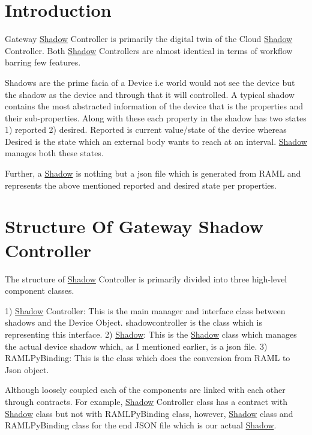 \hypertarget{index_intro_sec}{}\section{Introduction}\label{index_intro_sec}
Gateway \hyperlink{classShadow}{Shadow} Controller is primarily the digital twin of the Cloud \hyperlink{classShadow}{Shadow} Controller. Both \hyperlink{classShadow}{Shadow} Controllers are almost identical in terms of workflow barring few features.

Shadows are the prime facia of a Device i.\+e world would not see the device but the shadow as the device and through that it will controlled. A typical shadow contains the most abstracted information of the device that is the properties and their sub-\/properties. Along with these each property in the shadow has two states 1) reported 2) desired. Reported is current value/state of the device whereas Desired is the state which an external body wants to reach at an interval. \hyperlink{classShadow}{Shadow} manages both these states.

Further, a \hyperlink{classShadow}{Shadow} is nothing but a json file which is generated from R\+A\+ML and represents the above mentioned reported and desired state per properties.\hypertarget{index_structure_sec}{}\section{Structure Of Gateway Shadow Controller}\label{index_structure_sec}
The structure of \hyperlink{classShadow}{Shadow} Controller is primarily divided into three high-\/level component classes.

1) \hyperlink{classShadow}{Shadow} Controller\+: This is the main manager and interface class between shadows and the Device Object. shadowcontroller is the class which is representing this interface. 2) \hyperlink{classShadow}{Shadow}\+: This is the \hyperlink{classShadow}{Shadow} class which manages the actual device shadow which, as I mentioned earlier, is a json file. 3) R\+A\+M\+L\+Py\+Binding\+: This is the class which does the conversion from R\+A\+ML to Json object.

Although loosely coupled each of the components are linked with each other through contracts. For example, \hyperlink{classShadow}{Shadow} Controller class has a contract with \hyperlink{classShadow}{Shadow} class but not with R\+A\+M\+L\+Py\+Binding class, however, \hyperlink{classShadow}{Shadow} class and R\+A\+M\+L\+Py\+Binding class for the end J\+S\+ON file which is our actual \hyperlink{classShadow}{Shadow}.

